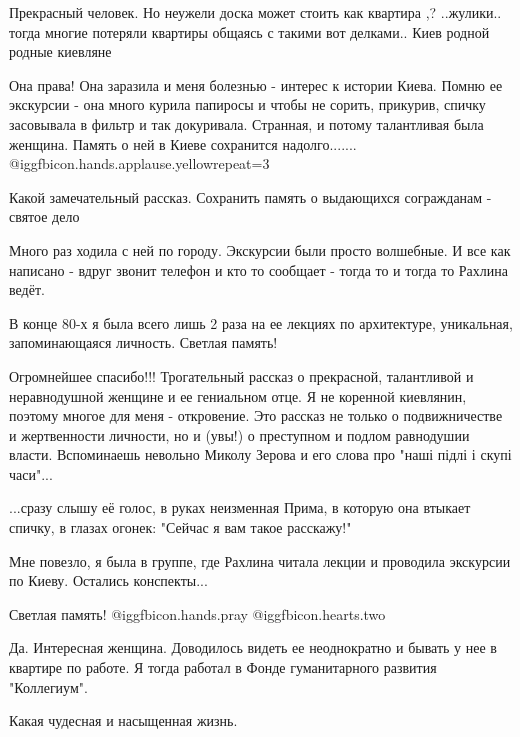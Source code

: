 \begin{itemize}

Прекрасный человек. Но неужели доска может стоить как квартира ,? ..жулики..
тогда многие потеряли квартиры общаясь с такими вот делками.. Киев родной родные
киевляне


Она права! Она заразила и меня болезнью - интерес к истории Киева. Помню ее
экскурсии - она много курила папиросы и чтобы не сорить, прикурив, спичку
засовывала в фильтр и так докуривала. Странная, и потому талантливая была
женщина. Память о ней в Киеве сохранится надолго....... @igg{fbicon.hands.applause.yellow}{repeat=3} 

Какой замечательный рассказ. Сохранить память о выдающихся согражданам - святое дело


Много раз ходила с ней по городу. Экскурсии были просто волшебные. И все как
написано - вдруг звонит телефон и кто то сообщает - тогда то и тогда то Рахлина
ведёт.


В конце 80-х я была всего лишь 2 раза на ее лекциях по архитектуре, уникальная,
запоминающаяся личность. Светлая память!


Огромнейшее спасибо!!! Трогательный рассказ о прекрасной, талантливой и неравнодушной женщине и ее гениальном отце.
Я не коренной киевлянин, поэтому многое для меня - откровение.
Это рассказ не только о подвижничестве и жертвенности личности, но и (увы!) о преступном и подлом равнодушии власти.
Вспоминаешь невольно Миколу Зерова и его слова про "наші підлі і скупі часи"...


...сразу слышу её голос, в руках неизменная Прима, в которую она втыкает
спичку, в глазах огонек: "Сейчас я вам такое расскажу!"

Мне повезло, я была в группе, где Рахлина читала лекции и проводила экскурсии
по Киеву. Остались конспекты...

Светлая память! @igg{fbicon.hands.pray}  @igg{fbicon.hearts.two} 


Да. Интересная женщина. Доводилось видеть ее неоднократно и бывать у нее в
квартире по работе. Я тогда работал в Фонде гуманитарного развития "Коллегиум".

Какая чудесная и насыщенная жизнь.


\end{itemize}
